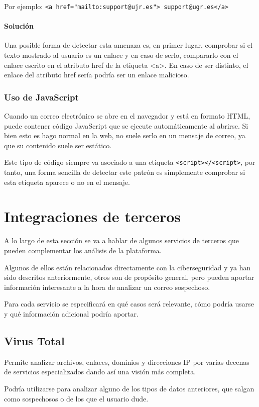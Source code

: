 Por ejemplo: \verb|<a href="mailto:support@ujr.es"> support@ugr.es</a>|

\paragraph{Solución}
Una posible forma de detectar esta amenaza es, en primer lugar, comprobar si el texto mostrado al usuario es un enlace y en caso de serlo, compararlo con el enlace escrito en el atributo href de la etiqueta <a>. En caso de ser distinto, el enlace del atributo href sería podría ser un enlace malicioso. 

\subsubsection{Uso de JavaScript}
Cuando un correo electrónico se abre en el navegador y está en formato HTML, puede contener código JavaScript que se ejecute automáticamente al abrirse. Si bien esto es hago normal en la web, no suele serlo en un mensaje de correo, ya que su contenido suele ser estático. 

Este tipo de código siempre va asociado a una etiqueta \verb|<script></<script>|, por tanto, una forma sencilla de detectar este patrón es simplemente comprobar si esta etiqueta aparece o no en el mensaje. 

\section{Integraciones de terceros}
A lo largo de esta sección se va a hablar de algunos servicios de terceros que pueden complementar los análisis de la plataforma. 

Algunos de ellos están relacionados directamente con la ciberseguridad y ya han sido descritos anteriormente, otros son de propósito general, pero pueden aportar información interesante a la hora de analizar un correo sospechoso. 

Para cada servicio se especificará en qué casos será relevante, cómo podría usarse y qué información adicional podría aportar.

\subsection{Virus Total}
Permite analizar archivos, enlaces, dominios y direcciones IP por varias decenas de servicios especializados dando así una visión más completa. 

Podría utilizarse para analizar alguno de los tipos de datos anteriores, que salgan como sospechosos o de los que el usuario dude.

